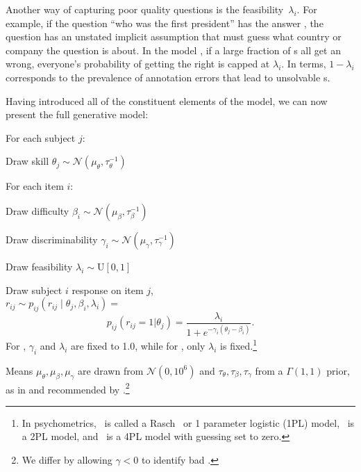 Another way of capturing poor quality questions is the
feasibility~$\lambda_i$.
For example, if the question ``who was the first president'' has the
answer , the question has an unstated implicit
assumption that \subjs{} must guess what country or company the
question is about.
In the model {\bf {}}, if a large fraction of \subj{}s all get an
\itm{} wrong, everyone's probability of getting the \itm{} right is
capped at $\lambda_i$.
In \nlp{} terms, $1-\lambda_i$ corresponds to the prevalence of annotation
errors that lead to unsolvable \itm{}s.


Having introduced all of the constituent elements of the model, we can
now present the full generative model:
\begin{enumerate*}
  \item For each subject $j$:
  \begin{enumerate*}
    \item Draw skill $\theta_j \sim \mathcal{N}(\mu_\theta, \tau_\theta^{-1})$
  \end{enumerate*}
  \item For each item $i$:
  \begin{enumerate*}
    \item Draw difficulty $\beta_i \sim\mathcal{N}(\mu_\beta, \tau_\beta^{-1})$
    \item Draw discriminability $\gamma_i \sim \mathcal{N}(\mu_\gamma, \tau_\gamma^{-1})$
    \item Draw feasibility $\lambda_i \sim \text{U}[0,1]$
  \end{enumerate*}
  \item Draw subject $i$ response on item $j$,\\$r_{ij} \sim p_{ij}(r_{ij} \mid \theta_j, \beta_i, \lambda_i )=$
    \begin{equation}
      p_{ij}(r_{ij}=1|\theta_j)=\frac{\lambda_i}{1+e^{-\gamma_i(\theta_j-\beta_i)}}.
      \label{eq:isicle:ours}
    \end{equation}
    For , $\gamma_i$ and $\lambda_i$ are fixed to 1.0, while for
    , only $\lambda_i$ is fixed.\footnote{In psychometrics, ~is called a Rasch~\citep{rasch1960studies} or 1 parameter logistic (1PL) model, ~is a 2PL model, and ~is a 4PL model with guessing set to zero.}
\end{enumerate*}
Means $\mu_\theta,\mu_\beta,\mu_\gamma$ are drawn from
$\mathcal{N}(0,10^6)$ and $\tau_\theta,\tau_\beta,\tau_\gamma$
from a $\Gamma(1,1)$ prior, as in \citet{lalor2019latent} and
recommended by \citet{natesan2016birt}.\footnote{We differ by
  allowing $\gamma<0$ to identify bad \itms{}.  }

